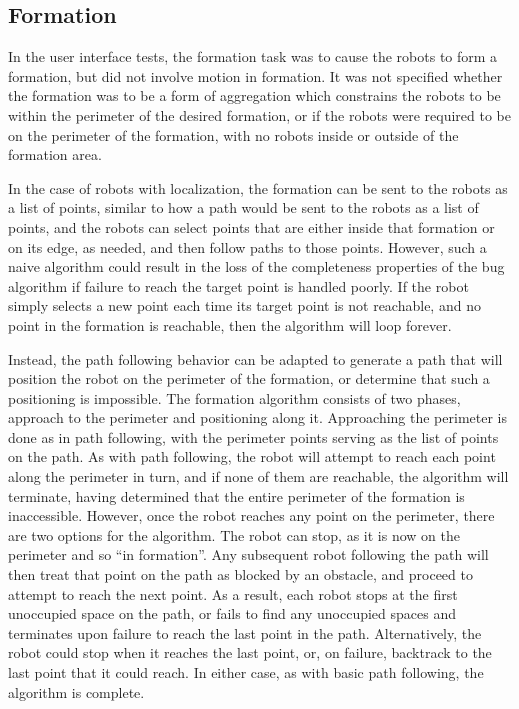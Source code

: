 \subsection{Formation}

In the user interface tests, the formation task was to cause the robots to form a formation, but did not involve motion in formation. 
It was not specified whether the formation was to be a form of aggregation which constrains the robots to be within the perimeter of the desired formation, or if the robots were required to be on the perimeter of the formation, with no robots inside or outside of the formation area. 

In the case of robots with localization, the formation can be sent to the robots as a list of points, similar to how a path would be sent to the robots as a list of points, and the robots can select points that are either inside that formation or on its edge, as needed, and then follow paths to those points. 
However, such a naive algorithm could result in the loss of the completeness properties of the bug algorithm if failure to reach the target point is handled poorly. 
If the robot simply selects a new point each time its target point is not reachable, and no point in the formation is reachable, then the algorithm will loop forever. 

Instead, the path following behavior can be adapted to generate a path that will position the robot on the perimeter of the formation, or determine that such a positioning is impossible.
The formation algorithm consists of two phases, approach to the perimeter and positioning along it. 
Approaching the perimeter is done as in path following, with the perimeter points serving as the list of points on the path. 
As with path following, the robot will attempt to reach each point along the perimeter in turn, and if none of them are reachable, the algorithm will terminate, having determined that the entire perimeter of the formation is inaccessible. 
However, once the robot reaches any point on the perimeter, there are two options for the algorithm. 
The robot can stop, as it is now on the perimeter and so ``in formation''. 
Any subsequent robot following the path will then treat that point on the path as blocked by an obstacle, and proceed to attempt to reach the next point. 
As a result, each robot stops at the first unoccupied space on the path, or fails to find any unoccupied spaces and terminates upon failure to reach the last point in the path. 
Alternatively, the robot could stop when it reaches the last point, or, on failure, backtrack to the last point that it could reach.%
In either case, as with basic path following, the algorithm is complete. 

